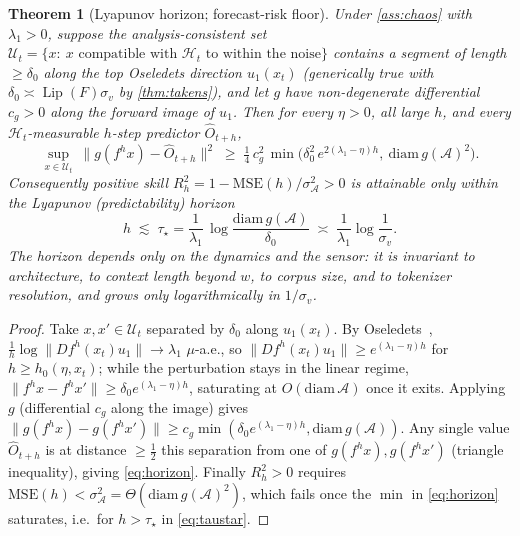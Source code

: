 \documentclass[10pt]{article}
\theoremstyle{plain}
\newtheorem{theorem}{Theorem}[section]
\theoremstyle{definition}
\theoremstyle{remark}
\newcommand{\attr}{\mathcal{A}}
\newcommand{\srb}{\mu}
\DeclareMathOperator{\Lip}{Lip}
\begin{document}
\begin{theorem}[Lyapunov horizon; forecast-risk floor]\label{thm:horizon}
Under \cref{ass:chaos} with $\lambda_1>0$, suppose the analysis-consistent set
$\mathcal U_t=\{x:\ x\text{ compatible with }\mathcal H_t\text{ to within the
noise}\}$ contains a segment of length $\ge\delta_0$ along the top Oseledets
direction $u_1(x_t)$ \textup{(}generically true with $\delta_0\asymp\Lip(F)
\sigma_v$ by \cref{thm:takens}\textup{)}, and let $g$ have non-degenerate
differential $c_g>0$ along the forward image of $u_1$. Then for every $\eta>0$,
all large $h$, and every $\mathcal H_t$-measurable $h$-step predictor
$\hat O_{t+h}$,
\begin{equation}
 \sup_{x\in\mathcal U_t}\ \big\|g(f^h x)-\hat O_{t+h}\big\|^2
 \;\ge\;\tfrac14\,c_g^2\,
   \min\!\Big(\delta_0^2\,e^{2(\lambda_1-\eta)h},\ \mathrm{diam}\,g(\attr)^2\Big).
 \label{eq:horizon}
\end{equation}
Consequently positive skill $R^2_h=1-\mathrm{MSE}(h)/\sigma_{\attr}^2>0$ is
attainable only within the \emph{Lyapunov (predictability) horizon}
\begin{equation}
 h\;\lesssim\;\tau_\star=\frac1{\lambda_1}\,
   \log\frac{\mathrm{diam}\,g(\attr)}{\delta_0}
   \;\asymp\;\frac1{\lambda_1}\log\frac1{\sigma_v}.
 \label{eq:taustar}
\end{equation}
The horizon depends only on the dynamics and the sensor: it is invariant to
architecture, to context length beyond $w$, to corpus size, and to tokenizer
resolution, and grows only logarithmically in $1/\sigma_v$.
\end{theorem}
\begin{proof}
Take $x,x'\in\mathcal U_t$ separated by $\delta_0$ along $u_1(x_t)$. By
Oseledets~\cite{oseledets1968}, $\tfrac1h\log\|Df^h(x_t)u_1\|\to\lambda_1$
$\srb$-a.e., so $\|Df^h(x_t)u_1\|\ge e^{(\lambda_1-\eta)h}$ for $h\ge
h_0(\eta,x_t)$; while the perturbation stays in the linear regime,
$\|f^hx-f^hx'\|\ge\delta_0e^{(\lambda_1-\eta)h}$, saturating at
$O(\mathrm{diam}\,\attr)$ once it exits. Applying $g$ (differential $c_g$ along the
image) gives $\|g(f^hx)-g(f^hx')\|\ge c_g\min(\delta_0e^{(\lambda_1-\eta)h},
\mathrm{diam}\,g(\attr))$. Any single value $\hat O_{t+h}$ is at distance
$\ge\tfrac12$ this separation from one of $g(f^hx),g(f^hx')$ (triangle
inequality), giving \eqref{eq:horizon}. Finally $R^2_h>0$ requires
$\mathrm{MSE}(h)<\sigma_{\attr}^2=\Theta(\mathrm{diam}\,g(\attr)^2)$, which fails
once the $\min$ in \eqref{eq:horizon} saturates, i.e.\ for $h>\tau_\star$ in
\eqref{eq:taustar}.
\end{proof}
\end{document}
